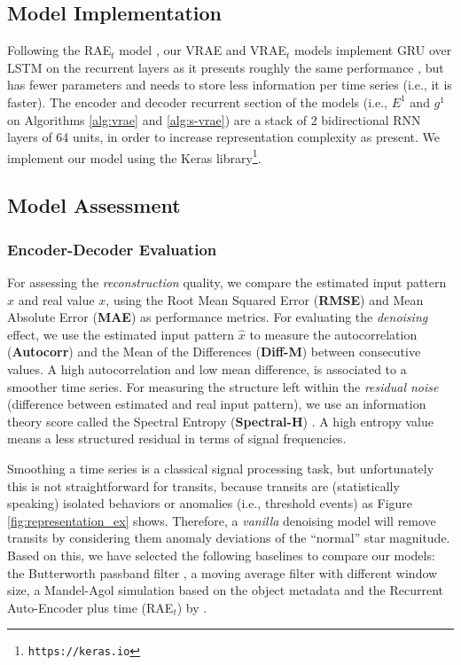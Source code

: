 \subsection{Model Implementation}
Following the RAE$_t$ model \citep{naul2018recurrent}, our VRAE and VRAE$_t$ models implement GRU over LSTM on the recurrent layers as it presents roughly the same performance \citep{chung2014empirical}, but has fewer parameters and needs to store less information per time series (i.e., it is faster). The encoder and decoder recurrent section of the models (i.e., $E^1$ and $g^1$ on Algorithms \ref{alg:vrae} and \ref{alg:s-vrae}) are a stack of 2 bidirectional RNN layers of 64 units, in order to increase representation complexity as \citep{naul2018recurrent} present. We implement our model using the Keras library\footnote{\texttt{https://keras.io}}.   %


\subsection{Model Assessment}


\subsubsection*{Encoder-Decoder Evaluation} %

For assessing the \textit{reconstruction} quality, we compare the estimated input pattern $\hat{x}$ and real value $x$, using the Root Mean Squared Error (\textbf{RMSE}) and Mean Absolute Error (\textbf{MAE}) as performance metrics. For evaluating the \textit{denoising} effect, we use the estimated input pattern $\hat{x}$ to measure the autocorrelation (\textbf{Autocorr}) and the Mean of the Differences (\textbf{Diff-M}) between consecutive values. A high autocorrelation and low mean difference, is associated to a smoother time series. For measuring the structure left within the \textit{residual noise} (difference between estimated and real input pattern), we use
an information theory score called the Spectral Entropy (\textbf{Spectral-H}) \citep{inouye1991quantification}. A high entropy value means a less structured residual in terms of signal frequencies.

Smoothing a time series is a classical signal processing task, but unfortunately this is not straightforward for transits, because transits are (statistically speaking) isolated behaviors or anomalies (i.e., threshold events) as Figure \ref{fig:representation_ex} shows. Therefore, a \textit{vanilla} denoising model will remove transits by considering them anomaly deviations of the ``normal'' star magnitude.
Based on this, we have selected the following baselines to compare our models: the Butterworth passband filter \citep{chandrakar2013survey}, a moving average filter with different window size, a Mandel-Agol simulation based on the object metadata and the Recurrent Auto-Encoder plus time (RAE$_t$) by \citep{naul2018recurrent} .

